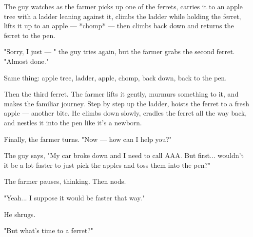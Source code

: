 The guy watches as the farmer picks up one of the ferrets, carries it to an apple tree with a ladder leaning against it, climbs the ladder while holding the ferret, lifts it up to an apple — *chomp* — then climbs back down and returns the ferret to the pen.

"Sorry, I just — " the guy tries again, but the farmer grabs the second ferret. "Almost done."

Same thing: apple tree, ladder, apple, chomp, back down, back to the pen.

Then the third ferret. The farmer lifts it gently, murmurs something to it, and makes the familiar journey. Step by step up the ladder, hoists the ferret to a fresh apple — another bite. He climbs down slowly, cradles the ferret all the way back, and nestles it into the pen like it's a newborn.

Finally, the farmer turns. "Now — how can I help you?"

The guy says, "My car broke down and I need to call AAA. But first... wouldn't it be a lot faster to just pick the apples and toss them into the pen?"

The farmer pauses, thinking. Then nods.

"Yeah... I suppose it would be faster that way."

He shrugs.

"But what's time to a ferret?"